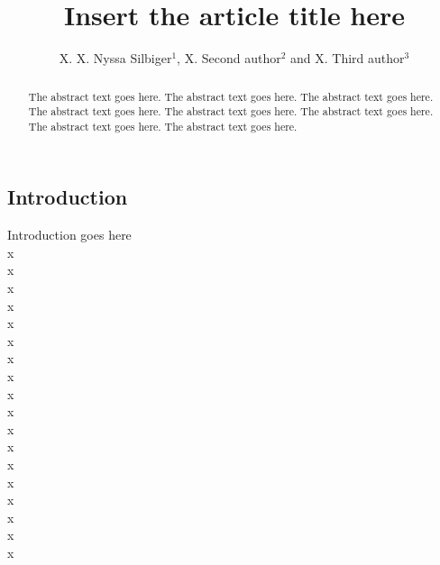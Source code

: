 \documentclass[]{rsos}%
\begin{document}
\title{Insert the article title here}

\author{%
X. X. Nyssa Silbiger$^{1}$, X. Second author$^{2}$ and X. Third author$^{3}$}

\address{$^{1}$University of California, Irvine\\
$^{2}$Second author address\\
$^{3}$Third author address}

\subject{xxxxx, xxxxx, xxxx}



\begin{abstract}
The abstract text goes here. The abstract text goes here. The abstract text goes here. The abstract text goes here.
The abstract text goes here. The abstract text goes here. The abstract text goes here. The abstract text goes here.
\end{abstract}


\begin{fmtext}
\section{Introduction}

Introduction goes here \\
x\\
x\\
x\\
x\\
x\\
x\\
x\\
x\\
x\\
x\\
x\\
x\\
x\\
x\\
x\\
x\\
x\\
x\\


\end{fmtext}
\end{document}
